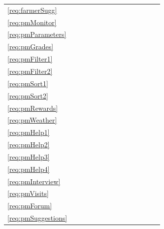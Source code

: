 \documentclass[10pt]{article}
\begin{document}
\begin{table}[]
\begin{tabular}{l|lllll|llllllll}
    \ref{req:farmerSugg} &    &    &    &    &    &     &     &     &     &     &     &     &     \\
    \ref{req:pmMonitor} &    &    &    &    &    &     &     &     &     &     &     &     &     \\
    \ref{req:pmParameters} &    &    &    &    &    &     &     &     &     &     &     &     &     \\
    \ref{req:pmGrades} &    &    &    &    &    &     &     &     &     &     &     &     &     \\
    \ref{req:pmFilter1} &    &    &    &    &    &     &     &     &     &     &     &     &     \\
    \ref{req:pmFilter2} &    &    &    &    &    &     &     &     &     &     &     &     &     \\
    \ref{req:pmSort1} &    &    &    &    &    &     &     &     &     &     &     &     &     \\
    \ref{req:pmSort2} &    &    &    &    &    &     &     &     &     &     &     &     &     \\
    \ref{req:pmRewards} &    &    &    &    &    &     &     &     &     &     &     &     &     \\
    \ref{req:pmWeather} &    &    &    &    &    &     &     &     &     &     &     &     &     \\
    \ref{req:pmHelp1} &    &    &    &    &    &     &     &     &     &     &     &     &     \\
    \ref{req:pmHelp2} &    &    &    &    &    &     &     &     &     &     &     &     &     \\
    \ref{req:pmHelp3} &    &    &    &    &    &     &     &     &     &     &     &     &     \\
    \ref{req:pmHelp4} &    &    &    &    &    &     &     &     &     &     &     &     &     \\
    \ref{req:pmInterview} &    &    &    &    &    &     &     &     &     &     &     &     &     \\
    \ref{req:pmVisits} &    &    &    &    &    &     &     &     &     &     &     &     &     \\
    \ref{req:pmForum} &    &    &    &    &    &     &     &     &     &     &     &     &     \\
    \ref{req:pmSuggestions} &    &    &    &    &    &     &     &     &     &     &     &     &     \\
    \end{tabular}
\end{table}
\end{document}
